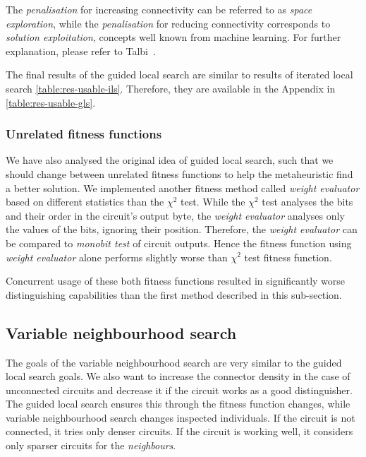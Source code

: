 \documentclass[
  print, %
  Table,   %
  nolof,     %
  nolot,     %
  11pt, %
  oneside  %
]{fithesis3}
\begin{document}
The \textit{penalisation} for increasing connectivity can be referred to as \textit{space exploration}, while the \textit{penalisation} for reducing connectivity corresponds to \textit{solution exploitation}, concepts well known from machine learning. For further explanation, please refer to Talbi~\cite[Section 1.3.3, page 24]{talbi2009metaheuristics}.

The final results of the guided local search are similar to results of iterated local search \cref{table:res-usable-ils}. Therefore, they are available in the Appendix in \cref{table:res-usable-gls}.

\subsubsection{\textbf{Unrelated fitness functions}}

We have also analysed the original idea of guided local search, such that we should change between unrelated fitness functions to help the metaheuristic find a better solution. We implemented another fitness method called \textit{weight evaluator} based on different statistics than the $\chi^{2}$ test. While the $\chi^{2}$ test analyses the bits and their order in the circuit's output byte, the \textit{weight evaluator} analyses only the values of the bits, ignoring their position. Therefore, the \textit{weight evaluator} can be compared to \textit{monobit test} of circuit outputs. Hence the fitness function using \textit{weight evaluator} alone performs slightly worse than $\chi^{2}$ test fitness function.

Concurrent usage of these both fitness functions resulted in significantly worse distinguishing capabilities than the first method described in this sub-section.


\subsection{Variable neighbourhood search}
\label{subsec:res-ss-vns}

The goals of the variable neighbourhood search are very similar to the guided local search goals. We also want to increase the connector density in the case of unconnected circuits and decrease it if the circuit works as a good distinguisher. The guided local search ensures this through the fitness function changes, while variable neighbourhood search changes inspected individuals. If the circuit is not connected, it tries only denser circuits. If the circuit is working well, it considers only sparser circuits for the \textit{neighbours}.
\end{document}
